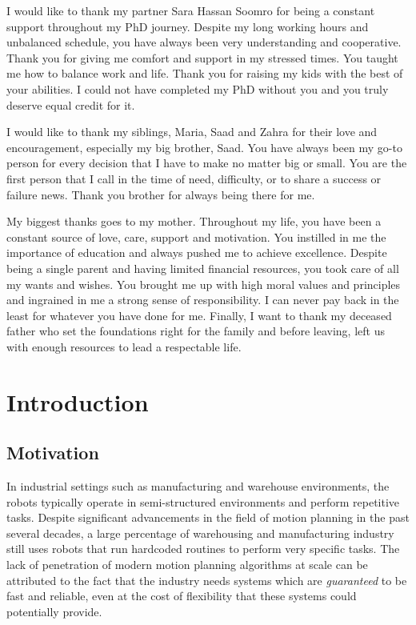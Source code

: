 \documentclass[a4paper]{report}
\begin{document}
I would like to thank my partner Sara Hassan Soomro for being a constant support throughout my PhD journey. Despite my long working hours and unbalanced schedule, you have always been very understanding and cooperative. Thank you for giving me comfort and support in my stressed times. You taught me how to balance work and life. Thank you for raising my kids with the best of your abilities. I could not have completed my PhD without you and you truly deserve equal credit for it.

I would like to thank my siblings, Maria, Saad and Zahra for their love and encouragement, especially my big brother, Saad. You have always been my go-to person for every decision that I have to make no matter big or small. You are the first person that I call in the time of need, difficulty, or to share a success or failure news. Thank you brother for always being there for me.

My biggest thanks goes to my mother. Throughout my life, you have been a constant source of love, care, support and motivation. You instilled in me the importance of education and always pushed me to achieve excellence. Despite being a single parent and having limited financial resources, you took care of all my wants and wishes. You brought me up with high moral values and principles and ingrained in me a strong sense of responsibility. I can never pay back in the least for whatever you have done for me. Finally, I want to thank my deceased father who set the foundations right for the family and before leaving, left us with enough resources to lead a respectable life.

\tableofcontents
\newpage

\chapter{Introduction}
\section{Motivation}
In industrial settings such as manufacturing and warehouse environments, the robots typically operate in semi-structured environments and perform repetitive tasks. Despite significant advancements in the field of motion planning in the past several decades, a large percentage of warehousing and manufacturing industry still uses robots that run hardcoded routines to perform very specific tasks. The lack of penetration of modern motion planning algorithms at scale can be attributed to the fact that the industry needs systems which are \emph{guaranteed} to be fast and reliable, even at the cost of flexibility that these systems could potentially provide.
\end{document}
